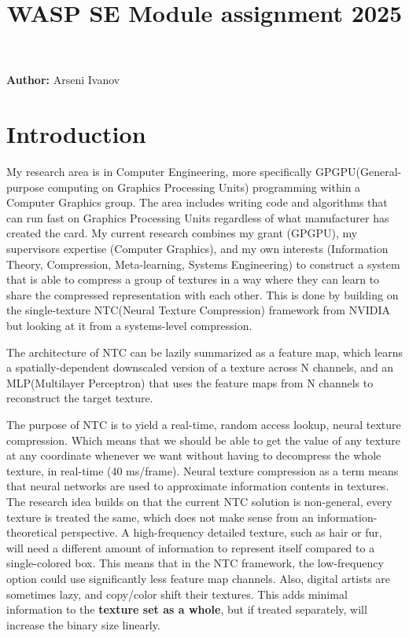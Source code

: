 \documentclass[a4paper, 11pt]{article} %
\title{WASP SE Module assignment 2025}
\date{}
\author{}
\begin{document}
\maketitle

\noindent\textbf{Author:} Arseni Ivanov\\

\section{Introduction}
My research area is in Computer Engineering, more specifically GPGPU(General-purpose computing on Graphics Processing Units) programming within a Computer Graphics group. The area includes writing code and algorithms that can run fast on Graphics Processing Units regardless of
what manufacturer has created the card. My current research combines my grant (GPGPU), my supervisors expertise (Computer Graphics), and my own interests (Information Theory, Compression, Meta-learning, Systems Engineering) to
construct a system that is able to compress a group of textures in a way where they can learn to share the compressed representation with each other. This is done by building on the single-texture NTC(Neural Texture Compression\cite{ntc}) framework from NVIDIA
but looking at it from a systems-level compression.

The architecture of NTC can be lazily summarized as a feature map, which learns a spatially-dependent downscaled version of a texture across N channels, and an MLP(Multilayer Perceptron) that uses the feature maps from N channels to reconstruct the target texture.

The purpose of NTC is to yield a real-time, random access lookup, neural texture compression. Which means that we should be able to get the value of any texture at any coordinate whenever we want without having to decompress the whole texture, in real-time (40 ms/frame).
Neural texture compression as a term means that neural networks are used to approximate information contents in textures.
The research idea builds on that the current NTC solution is non-general, every texture is treated the same, which does not make sense from an information-theoretical perspective.
A high-frequency detailed texture, such as hair or fur, will need a different amount of information to represent itself compared to a single-colored box.
This means that in the NTC framework, the low-frequency option could use significantly less feature map channels.
Also, digital artists are sometimes lazy, and copy/color shift their textures. This adds minimal information to the \textbf{texture set as a whole}, but if treated separately, will increase the binary size linearly.  
\end{document}
